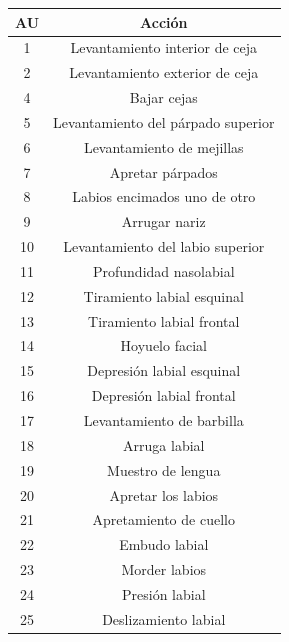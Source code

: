\begin{table}[H]
\centering
\begin{tabular}{|c|c|}
\hline
\textbf{AU} & \textbf{Acción} \\ \hline
1             & Levantamiento interior de ceja      \\ \hline
2             & Levantamiento exterior de ceja      \\ \hline
4             & Bajar cejas                         \\ \hline
5             & Levantamiento del párpado superior  \\ \hline
6             & Levantamiento de mejillas           \\ \hline
7             & Apretar párpados                    \\ \hline
8             & Labios encimados uno de otro        \\ \hline
9             & Arrugar nariz                       \\ \hline
10            & Levantamiento del labio superior    \\ \hline
11            & Profundidad nasolabial              \\ \hline
12            & Tiramiento labial esquinal          \\ \hline
13            & Tiramiento labial frontal           \\ \hline
14            & Hoyuelo facial                      \\ \hline
15            & Depresión labial esquinal           \\ \hline
16            & Depresión labial frontal            \\ \hline
17            & Levantamiento de barbilla           \\ \hline
18            & Arruga labial                       \\ \hline
19            & Muestro de lengua                   \\ \hline
20            & Apretar los labios                  \\ \hline
21            & Apretamiento de cuello              \\ \hline
22            & Embudo labial                       \\ \hline
23            & Morder labios                       \\ \hline
24            & Presión labial                      \\ \hline
25            & Deslizamiento labial                \\ \hline

\end{tabular}
\end{table}
